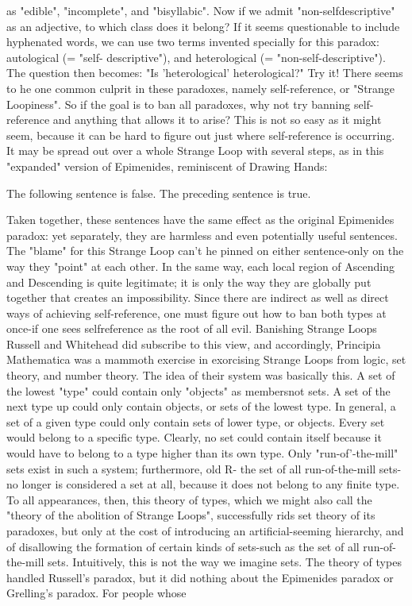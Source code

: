 






as "edible", "incomplete", and "bisyllabic". Now if we admit "non-selfdescriptive" as an adjective, to which class does it belong? If it seems questionable to include hyphenated words, we can use two terms invented specially for this paradox: autological (= "self- descriptive"), and heterological (= "non-self-descriptive"). The question then becomes: "Is 'heterological' heterological?" Try it! There seems to he one common culprit in these paradoxes, namely self-reference, or "Strange Loopiness". So if the goal is to ban all paradoxes, why not try banning self- reference and anything that allows it to arise? This is not so easy as it might seem, because it can be hard to figure out just where self-reference is occurring. It may be spread out over a whole Strange Loop with several steps, as in this "expanded" version of Epimenides, reminiscent of Drawing Hands: 

The following sentence is false. The preceding sentence is true. 

Taken together, these sentences have the same effect as the original Epimenides paradox: yet separately, they are harmless and even potentially useful sentences. The "blame" for this Strange Loop can't he pinned on either sentence-only on the way they "point" at each other. In the same way, each local region of Ascending and Descending is quite legitimate; it is only the way they are globally put together that creates an impossibility. Since there are indirect as well as direct ways of achieving self-reference, one must figure out how to ban both types at once-if one sees selfreference as the root of all evil. Banishing Strange Loops Russell and Whitehead did subscribe to this view, and accordingly, Principia Mathematica was a mammoth exercise in exorcising Strange Loops from logic, set theory, and number theory. The idea of their system was basically this. A set of the lowest "type" could contain only "objects" as membersnot sets. A set of the next type up could only contain objects, or sets of the lowest type. In general, a set of a given type could only contain sets of lower type, or objects. Every set would belong to a specific type. Clearly, no set could contain itself because it would have to belong to a type higher than its own type. Only "run-of'-the-mill" sets exist in such a system; furthermore, old R- the set of all run-of-the-mill sets-no longer is considered a set at all, because it does not belong to any finite type. To all appearances, then, this theory of types, which we might also call the "theory of the abolition of Strange Loops", successfully rids set theory of its paradoxes, but only at the cost of introducing an artificial-seeming hierarchy, and of disallowing the formation of certain kinds of sets-such as the set of all run-of-the-mill sets. Intuitively, this is not the way we imagine sets. The theory of types handled Russell's paradox, but it did nothing about the Epimenides paradox or Grelling's paradox. For people whose 







